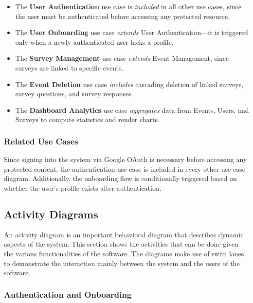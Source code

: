 \documentclass[11pt,a4paper]{article}
\begin{document}
\begin{itemize}[leftmargin=1.5em]
  \item The \textbf{User Authentication} use case is \textit{included} in all other use cases, since the user must be authenticated before accessing any protected resource.
  \item The \textbf{User Onboarding} use case \textit{extends} User Authentication---it is triggered only when a newly authenticated user lacks a profile.
  \item The \textbf{Survey Management} use case \textit{extends} Event Management, since surveys are linked to specific events.
  \item The \textbf{Event Deletion} use case \textit{includes} cascading deletion of linked surveys, survey questions, and survey responses.
  \item The \textbf{Dashboard Analytics} use case \textit{aggregates} data from Events, Users, and Surveys to compute statistics and render charts.
\end{itemize}


\subsubsection{Related Use Cases}

Since signing into the system via Google OAuth is necessary before accessing any protected content, the authentication use case is included in every other use case diagram. Additionally, the onboarding flow is conditionally triggered based on whether the user's profile exists after authentication.


\subsection{Activity Diagrams}

An activity diagram is an important behavioral diagram that describes dynamic aspects of the system. This section shows the activities that can be done given the various functionalities of the software. The diagrams make use of swim lanes to demonstrate the interaction mainly between the system and the users of the software.

\subsubsection{Authentication and Onboarding}
\end{document}
